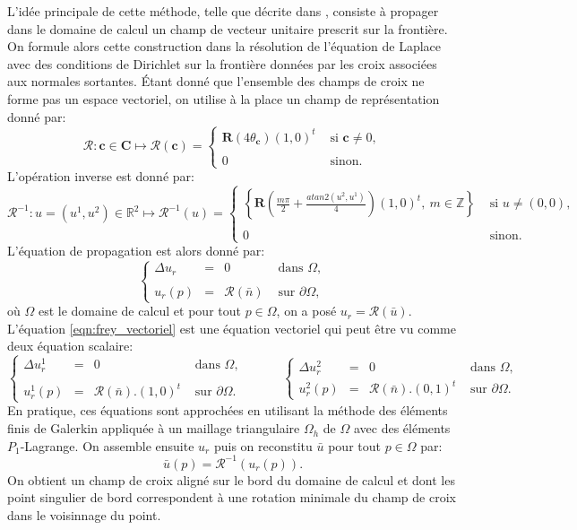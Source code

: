 L'idée principale de cette méthode, telle que décrite dans \cite{kowalski2013pde}, consiste à propager dans le domaine de calcul un champ de vecteur unitaire prescrit sur la frontière. On formule alors cette construction dans la résolution de l'équation de Laplace avec des conditions de Dirichlet sur la frontière données par les croix associées aux normales sortantes. Étant donné que l'ensemble des champs de croix ne forme pas un espace vectoriel, on utilise à la place un champ de représentation donné par:
$$
\mathcal{R}: \mathbf{c}\in\mathbf{C}\mapsto\mathcal{R}(\mathbf{c})=
\left\{
\begin{array}{ll}
\mathbf{R}(4\theta_{\mathbf{c}})(1, 0)^t& \mbox{ si }\mathbf{c}\neq 0,\\\\
0&\mbox{ sinon}.
\end{array}
\right.
$$
L'opération inverse est donné par:
$$
\mathcal{R}^{-1}: u=(u^1, u^2)\in\mathbb{R}^2\mapsto\mathcal{R}^{-1}(u)=
\left\{
\begin{array}{ll}
\displaystyle\left\{\mathbf{R}\left(\frac{m\pi}{2}+\frac{atan2(u^2, u^1)}{4}\right)(1, 0)^t,~ m\in \mathbb{Z}\right\} &\mbox{ si }u\neq (0,0),\\\\
0&\mbox{ sinon}.
\end{array}
\right.
$$
L'équation de propagation est alors donné par:
\begin{equation}
\left\{
\begin{array}{lcll}
\Delta u_r &=& 0 &\mbox{ dans }\Omega,\\\\
u_r(p)&=&\mathcal{R}(\bar{n}) & \mbox{ sur } \partial\Omega,
\end{array}
\right.
\label{eqn:frey_vectoriel}
\end{equation}
où $\Omega$ est le domaine de calcul et pour tout $p\in\Omega$, on a posé $u_r=\mathcal{R}(\bar{u})$. L'équation \eqref{eqn:frey_vectoriel} est une équation vectoriel qui peut être vu comme deux équation scalaire:
$$
\left\{
\begin{array}{lcll}
\Delta u_r^1 &=& 0 &\mbox{ dans }\Omega,\\\\
u_r^1(p)&=&\mathcal{R}(\bar{n}).(1, 0)^t & \mbox{ sur } \partial\Omega.
\end{array}
\right.
\quad\quad\quad
\left\{
\begin{array}{lcll}
\Delta u_r^2 &=& 0 &\mbox{ dans }\Omega,\\[0.5cm]
u_r^2(p)&=&\mathcal{R}(\bar{n}).(0, 1)^t & \mbox{ sur } \partial\Omega.
\end{array}
\right.
$$
En pratique, ces équations sont approchées en utilisant la méthode des éléments finis de Galerkin appliquée à un maillage triangulaire $\Omega_h$ de $\Omega$ avec des éléments $P_1$-Lagrange. On assemble ensuite $u_r$ puis on reconstitu $\bar{u}$ pour tout $p\in\Omega$ par:
$$
\bar{u}(p)=\mathcal{R}^{-1}(u_r(p)).
$$
On obtient un champ de croix aligné sur le bord du domaine de calcul et dont les point singulier de bord correspondent à une rotation minimale du champ de croix dans le voisinnage du point.

